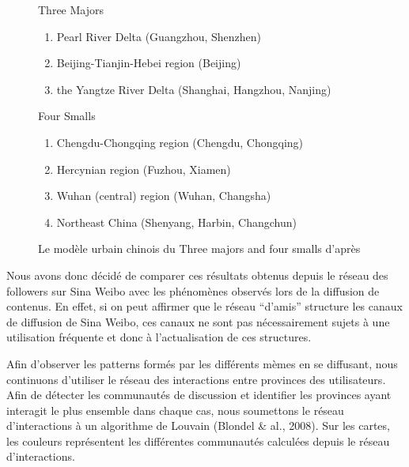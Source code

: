 \begin{figure}
    \centering
    
    \begin{description}
    \item Three Majors
      \begin{enumerate}
      \item Pearl River Delta (Guangzhou, Shenzhen)
      \item Beijing-Tianjin-Hebei region (Beijing)
      \item the Yangtze River Delta (Shanghai, Hangzhou, Nanjing)
      \end{enumerate}

    \item Four Smalls
      \begin{enumerate}
      \item Chengdu-Chongqing region (Chengdu, Chongqing)
      \item Hercynian region (Fuzhou, Xiamen)
      \item Wuhan (central) region (Wuhan, Changsha)
      \item Northeast China (Shenyang, Harbin, Changchun)
      \end{enumerate}

    \end{description}

   \caption{
      Le mod\`ele urbain chinois du Three majors and four smalls d{\textquoteright}apr\`es \cite{Zhen2014}
    }
\end{figure}


Nous avons donc d\'ecid\'e de comparer ces r\'esultats obtenus depuis le
r\'eseau des followers sur Sina Weibo avec les ph\'enom\`enes
observ\'es lors de la diffusion de contenus. En effet, si on peut
affirmer que le r\'eseau
{\textquotedblleft}d{\textquoteright}amis{\textquotedblright} structure
les canaux de diffusion de Sina Weibo, ces canaux ne sont pas
n\'ecessairement sujets \`a une utilisation fr\'equente et donc \`a
l{\textquoteright}actualisation de ces structures.


Afin d{\textquoteright}observer les patterns form\'es par les
diff\'erents m\`emes en se diffusant, nous continuons
d{\textquoteright}utiliser le r\'eseau des interactions entre provinces
des utilisateurs. Afin de d\'etecter les communaut\'es de discussion et
identifier les provinces ayant interagit le plus ensemble dans chaque
cas, nous soumettons le r\'eseau d{\textquoteright}interactions \`a un
algorithme de Louvain (Blondel \& al., 2008). Sur les cartes, les
couleurs repr\'esentent les diff\'erentes communaut\'es calcul\'ees
depuis le r\'eseau d{\textquoteright}interactions.

